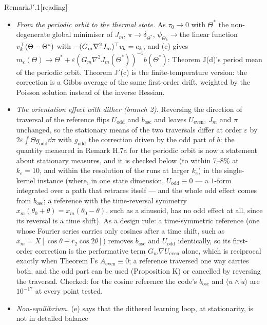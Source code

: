 \begin{rmk}{Remark}{J$'$.1}[reading]\mbox{}
\begin{itemize}
  \item \emph{From the periodic orbit to the thermal state.} As $\tau_0\to0$ with $\Theta^*$ the non-degenerate
    global minimiser of $J_m$, $\pi\to\delta_{\Theta^*}$, $\psi_{\Theta_k}\to{}$the linear function
    $v_k^\top(\Theta - \Theta^*)$ with $-(G_m\nabla^2J_m)^\top v_k = e_k$, and (c) gives
    $m_\varepsilon(\Theta)\to\Theta^* + \varepsilon(G_m\nabla^2J_m(\Theta^*))^{-1}b(\Theta^*)$: Theorem J(d)'s period
    mean of the periodic orbit. Theorem J$'$(c) is the finite-temperature version: the correction is a Gibbs average
    of the same first-order drift, weighted by the Poisson solution instead of the inverse Hessian.
  \item \emph{The orientation effect with dither (branch 2).} Reversing the direction of traversal of the reference
    flips $U_{\mathrm{odd}}$ and $b_{\mathrm{osc}}$ and leaves $U_{\mathrm{even}}$, $J_m$ and $\pi$ unchanged, so the
    stationary means of the two traversals differ at order $\varepsilon$ by
    $2\varepsilon\int\Theta g_{\mathrm{odd}}\dd\pi$ with $g_{\mathrm{odd}}$ the correction driven by the odd part of
    $b$: the quantity measured in Remark H.7a for the periodic orbit is now a statement about stationary measures, and
    it is checked below (to within 7--8\% at $k_e = 10$, and within the resolution of the runs at larger $k_e$) in the
    single-kernel instance (where, in one state dimension, $U_{\mathrm{odd}}\equiv0$ --- a $1$-form integrated over a
    path that retraces itself --- and the whole odd effect comes from $b_{\mathrm{osc}}$; a reference with the
    time-reversal symmetry $x_m(\theta_0 + \theta) = x_m(\theta_0 - \theta)$, such as a sinusoid, has no odd effect
    at all, since its reversal is a time shift). As a design rule: a time-symmetric reference (one whose Fourier series
    carries only cosines after a time shift, such as $x_m = X[\cos\theta + r_2\cos2\theta]$) removes
    $b_{\mathrm{osc}}$ and $U_{\mathrm{odd}}$ identically, so its first-order correction is the performative term
    $G_m\nabla U_{\mathrm{even}}$ alone, which is reciprocal exactly when Theorem I's $A_{\mathrm{even}}\equiv0$; a
    reference traversed one way carries both, and the odd part can be used (Proposition K) or cancelled by reversing
    the traversal. Checked: for the cosine reference the code's $b_{\mathrm{osc}}$ and $\langle u\wedge\dot u\rangle$
    are $10^{-17}$ at every point tested.
  \item \emph{Non-equilibrium.} (e) says that the dithered learning loop, at stationarity, is not in detailed balance

\end{itemize}
\end{rmk}
